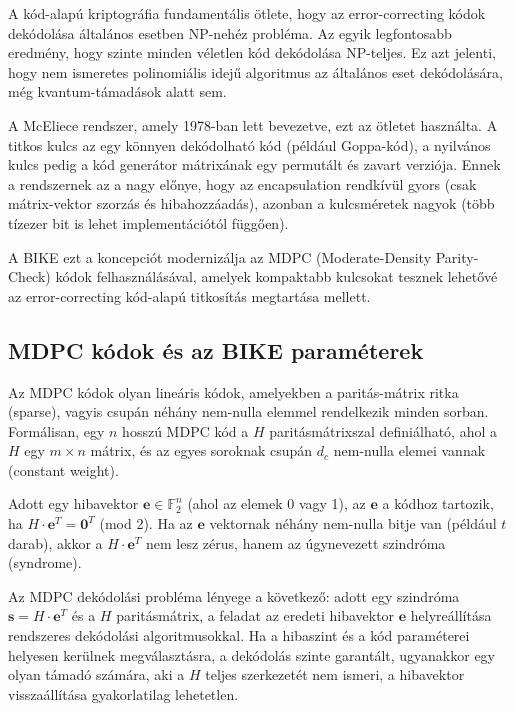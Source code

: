 A kód-alapú kriptográfia fundamentális ötlete, hogy az error-correcting kódok dekódolása általános 
esetben NP-nehéz probléma. Az egyik legfontosabb eredmény, hogy szinte minden véletlen kód dekódolása 
NP-teljes. Ez azt jelenti, hogy nem ismeretes polinomiális idejű algoritmus az általános eset 
dekódolására, még kvantum-támadások alatt sem.

A McEliece rendszer, amely 1978-ban lett bevezetve, ezt az ötletet használta. A titkos kulcs 
az egy könnyen dekódolható kód (például Goppa-kód), a nyilvános kulcs pedig a kód generátor 
mátrixának egy permutált és zavart verziója. Ennek a rendszernek az a nagy előnye, hogy 
az encapsulation rendkívül gyors (csak mátrix-vektor szorzás és hibahozzáadás), azonban 
a kulcsméretek nagyok (több tízezer bit is lehet implementációtól függően).

A BIKE ezt a koncepciót modernizálja az MDPC (Moderate-Density Parity-Check) kódok 
felhasználásával, amelyek kompaktabb kulcsokat tesznek lehetővé az error-correcting kód-alapú 
titkosítás megtartása mellett.

\subsection{MDPC kódok és az BIKE paraméterek}

Az MDPC kódok olyan lineáris kódok, amelyekben a paritás-mátrix ritka (sparse), vagyis 
csupán néhány nem-nulla elemmel rendelkezik minden sorban. Formálisan, egy $n$ hosszú 
MDPC kód a $H$ paritásmátrixszal definiálható, ahol a $H$ egy $m \times n$ mátrix, 
és az egyes soroknak csupán $d_c$ nem-nulla elemei vannak (constant weight).

Adott egy hibavektor $\mathbf{e} \in \mathbb{F}_2^n$ (ahol az elemek 0 vagy 1), 
az $\mathbf{e}$ a kódhoz tartozik, ha $H \cdot \mathbf{e}^T = \mathbf{0}^T$ (mod 2). 
Ha az $\mathbf{e}$ vektornak néhány nem-nulla bitje van (például $t$ darab), akkor 
a $H \cdot \mathbf{e}^T$ nem lesz zérus, hanem az úgynevezett szindróma (syndrome).

Az MDPC dekódolási probléma lényege a következő: adott egy szindróma $\mathbf{s} = H \cdot \mathbf{e}^T$
és a $H$ paritásmátrix, a feladat az eredeti hibavektor $\mathbf{e}$ helyreállítása rendszeres dekódolási
algoritmusokkal. Ha a hibaszint és a kód paraméterei helyesen kerülnek megválasztásra, a dekódolás
szinte garantált, ugyanakkor egy olyan támadó számára, aki a $H$ teljes szerkezetét nem ismeri,
a hibavektor visszaállítása gyakorlatilag lehetetlen.

